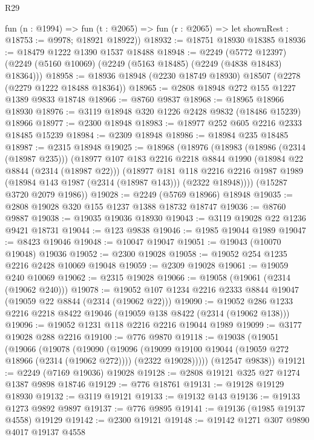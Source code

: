 \begin{lexlean}{R29}
\begin{coremodule}
      fun (n : @1994) =>
      fun (t : @2065) => fun (r : @2065) => let shownRest : @18753 := @9978; @18921 @18922))
@18932 := @18751 @18930 @18385
@18936 := @18479 @1222 @1390 @1537 @18488
@18948 := @2249
    (@5772 @12397)
    (@2249 (@5160 @10069) (@2249 (@5163 @18485) (@2249 (@4838 @18483) @18364)))
@18958 := @18936 @18948 (@2230 @18749 @18930) @18507 (@2278 (@2279 @1222 @18488 @18364))
@18965 := @2808 @18948 @272 @155 @1227 @1389 @9833 @18748
@18966 := @8760 @9837
@18968 := @18965 @18966 @18930
@18976 := @3119 @18948 @320 @1226 @2428 @9832 (@18486 @15239) @18966
@18977 := @2300 @18948
@18983 := @18977 @252 @605 @2216 @2333 @18485 @15239
@18984 := @2309 @18948
@18986 := @18984 @235 @18485
@18987 := @2315 @18948
@19025 := @18968
    (@18976
      (@18983
        (@18986 (@2314 (@18987 @235)))
        (@18977
          @107
          @183
          @2216
          @2218
          @8844
          @1990
          (@18984 @22 @8844 (@2314 (@18987 @22)))
          (@18977
            @181
            @118
            @2216
            @2216
            @1987
            @1989
            (@18984 @143 @1987 (@2314 (@18987 @143)))
            (@2322 @18948))))
      (@15287 @3720 @2079 @1986))
@19028 := @2249 (@5769 @18966) @18948
@19035 := @2808 @19028 @320 @155 @1237 @1388 @18732 @18747
@19036 := @8760 @9887
@19038 := @19035 @19036 @18930
@19043 := @3119 @19028 @22 @1236 @9421 @18731
@19044 := @123 @9838
@19046 := @1985 @19044 @1989
@19047 := @8423 @19046
@19048 := @10047 @19047
@19051 := @19043 (@10070 @19048) @19036
@19052 := @2300 @19028
@19058 := @19052 @254 @1235 @2216 @2428 @10069 @19048
@19059 := @2309 @19028
@19061 := @19059 @240 @10069
@19062 := @2315 @19028
@19066 := @19058 (@19061 (@2314 (@19062 @240)))
@19078 := @19052 @107 @1234 @2216 @2333 @8844 @19047 (@19059 @22 @8844 (@2314 (@19062 @22)))
@19090 := @19052 @286 @1233 @2216 @2218 @8422 @19046 (@19059 @138 @8422 (@2314 (@19062 @138)))
@19096 := @19052 @1231 @118 @2216 @2216 @19044 @1989
@19099 := @3177 @19028 @288 @2216
@19100 := @776 @9870
@19118 := @19038
    (@19051
      (@19066
        (@19078
          (@19090
            (@19096
              (@19099 @19100 @19044 (@19059 @272 @18966 (@2314 (@19062 @272))))
              (@2322 @19028)))))
      (@12547 @9838))
@19121 := @2249 (@7169 @19036) @19028
@19128 := @2808 @19121 @325 @27 @1274 @1387 @9898 @18746
@19129 := @776 @18761
@19131 := @19128 @19129 @18930
@19132 := @3119 @19121
@19133 := @19132 @143
@19136 := @19133 @1273 @9892 @9897
@19137 := @776 @9895
@19141 := @19136 (@1985 @19137 @4558) @19129
@19142 := @2300 @19121
@19148 := @19142 @1271 @307 @9890 @4017 @19137 @4558

\end{coremodule}
\end{lexlean}
